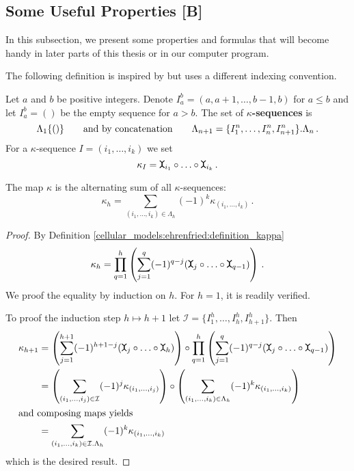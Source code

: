 \subsection{Some Useful Properties [B]}
In this subsection, we present some properties and formulas that will become handy in later parts of this thesis or in our computer program.

The following definition is inspired by \cite[Lemma 2.3.33]{Hess2012} but uses a different indexing convention.
\begin{defi}
    \label{cellular_models:ehrenfried:kappa_sequences}
    Let $a$ and $b$ be positive integers.
    Denote $I_a^b = (a,a+1, \ldots, b-1, b)$ for $a \le b$ and let $I_a^b = ()$ be the empty sequence for $a > b$.
    The set of {\bf $\kappa$-sequences} is
    \[
        \Lambda_1 \{ () \} \mspc{and by concatenation}{20} \Lambda_{n+1} = \{ I_1^n, \ldots, I_n^n, I_{n+1}^n \}.\Lambda_n \,.
    \]
    For a $\kappa$-sequence $I = (i_1, \ldots, i_k)$ we set
    \[
        \kappa_I = \mueta_{i_1} \circ \ldots \circ \mueta_{i_k} \,.
    \]
\end{defi}

\begin{lem}
    \label{cellular_models:ehrenfried:formula_for_kappa}
    The map $\kappa$ is the alternating sum of all $\kappa$-sequences:
    \[
        \kappa_h = \sum_{(i_1, \ldots, i_k) \in \Lambda_h} (-1)^k \kappa_{(i_1, \ldots, i_k)} \,.
    \]
\end{lem}

\begin{proof}
    By Definition \ref{cellular_models:ehrenfried:definition_kappa}
    \[
        \kappa_h = \prod_{q=1}^h \left( \sum_{j=1}^q (-1)^{q-j} (\mueta_j \circ \ldots \circ \mueta_{q-1}) \right) \,.
    \]
    We proof the equality by induction on $h$.
    For $h = 1$, it is readily verified.
    
    To proof the induction step $h \mapsto h+1$ let $\mathcal I = \{ I_1^h, \ldots, I_h^h, I_{h+1}^h \}$.
    Then
    \begin{align}
        \kappa_{h+1}
            &= \left( \sum_{j=1}^{h+1} (-1)^{h+1-j} (\mueta_j \circ \ldots \circ \mueta_h) \right) \circ \prod_{q=1}^{h} \left( \sum_{j=1}^q (-1)^{q-j} (\mueta_j \circ \ldots \circ \mueta_{q-1}) \right) \\
            &= \left( \sum_{(i_1, \ldots, i_j) \in \mathcal I} (-1)^{j} \kappa_{(i_1, \ldots, i_j)} \right) \circ \left( \sum_{(i_1, \ldots, i_k) \in \Lambda_h} (-1)^k \kappa_{(i_1, \ldots, i_k)} \right) \\
            \intertext{and composing maps yields}
            &= \sum_{(i_1, \ldots, i_k) \in \mathcal I .\Lambda_h} (-1)^k \kappa_{(i_1, \ldots, i_k)}
    \end{align}
    which is the desired result.
\end{proof}

